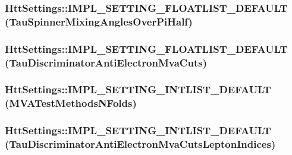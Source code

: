 \label{classHttSettings_acfacd3fac8bcf39c9d542077f20b540c}
\hypertarget{classHttSettings_a78aa8b6f16bf0238d8da0db91558762d}{
\subsubsection[{IMPL\_\-SETTING\_\-FLOATLIST\_\-DEFAULT}]{\setlength{\rightskip}{0pt plus 5cm}HttSettings::IMPL\_\-SETTING\_\-FLOATLIST\_\-DEFAULT (TauSpinnerMixingAnglesOverPiHalf)}}
\label{classHttSettings_a78aa8b6f16bf0238d8da0db91558762d}
\hypertarget{classHttSettings_aa62e419cb8c62e4690f4e49ee721984f}{
\subsubsection[{IMPL\_\-SETTING\_\-FLOATLIST\_\-DEFAULT}]{\setlength{\rightskip}{0pt plus 5cm}HttSettings::IMPL\_\-SETTING\_\-FLOATLIST\_\-DEFAULT (TauDiscriminatorAntiElectronMvaCuts)}}
\label{classHttSettings_aa62e419cb8c62e4690f4e49ee721984f}
\hypertarget{classHttSettings_a3ad9fb1a46b3cefcd55d59cae270079c}{
\subsubsection[{IMPL\_\-SETTING\_\-INTLIST\_\-DEFAULT}]{\setlength{\rightskip}{0pt plus 5cm}HttSettings::IMPL\_\-SETTING\_\-INTLIST\_\-DEFAULT (MVATestMethodsNFolds)}}
\label{classHttSettings_a3ad9fb1a46b3cefcd55d59cae270079c}
\hypertarget{classHttSettings_ab2dc5540ed68cd907957fa57019a6a4e}{
\subsubsection[{IMPL\_\-SETTING\_\-INTLIST\_\-DEFAULT}]{\setlength{\rightskip}{0pt plus 5cm}HttSettings::IMPL\_\-SETTING\_\-INTLIST\_\-DEFAULT (TauDiscriminatorAntiElectronMvaCutsLeptonIndices)}}
